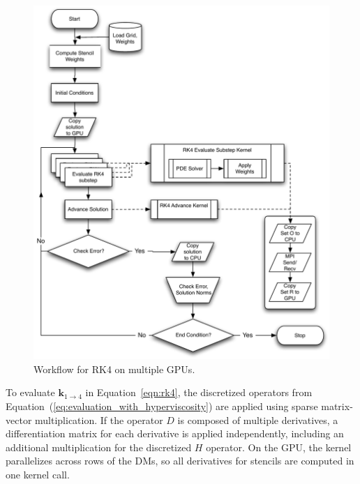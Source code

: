 \documentclass{report}
\begin{document}
\begin{figure}[t]
      \centering
       \includegraphics[width=5in]{../figures/paper1/figures/omnigraffle/RK4_multi_GPU_flow.pdf}
      \caption{Workflow for RK4 on multiple GPUs. }
      \label{fig:multi_GPU_flow}
\end{figure}


To evaluate $\mathbf{k}_{1\rightarrow4}$ in Equation~\ref{eqn:rk4}, the discretized operators from Equation~(\ref{eq:evaluation_with_hyperviscosity}) are applied using sparse matrix-vector multiplication. If the operator $D$ is composed of multiple derivatives, a differentiation matrix for each derivative is applied independently, including an additional multiplication for the discretized $H$ operator.
 On the GPU, the kernel parallelizes across rows of the DMs, so all derivatives for stencils are computed in one kernel call.
\end{document}
